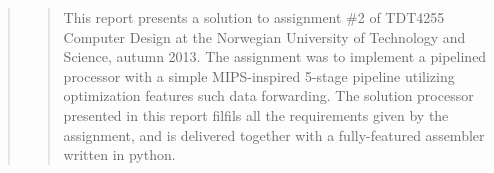 \begin{quote}
\begin{quote}
This report presents a solution to assignment \#2 of TDT4255 Computer Design at the Norwegian University of Technology and Science, autumn 2013.
The assignment was to implement a pipelined processor with a simple MIPS-inspired 5-stage pipeline utilizing optimization features such data forwarding.
The solution processor presented in this report filfils all the requirements given by the assignment, and is delivered together with a fully-featured assembler written in python.
\end{quote}
\end{quote}
